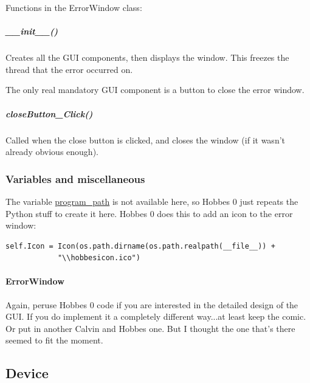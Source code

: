 \documentclass[12pt,letterpaper]{article}
\begin{document}
Functions in the ErrorWindow class:

\setcounter{subparagraph}{-1}



%
%
\subparagraph{\_\_init\_\_()}
\label{4.2.1.0.0}

Creates all the GUI components, then displays the window. This freezes the thread that the error occurred on.

The only real mandatory GUI component is a button to close the error window.



%
%
\subparagraph{closeButton\_Click()}
\label{4.2.1.0.1}

Called when the close button is clicked, and closes the window (if it wasn't already obvious enough).



%
%
\subsubsection{Variables and miscellaneous}
\label{4.2.2}

The variable \hyperref[4.1.2.1]{program\_path} is not available here, so Hobbes 0 just repeats the Python stuff to create it here. Hobbes 0 does this to add an icon to the error window:

\selectfont

\begin{lstlisting}
self.Icon = Icon(os.path.dirname(os.path.realpath(__file__)) +
            "\\hobbesicon.ico")
\end{lstlisting}

\selectfont

\setcounter{paragraph}{-1}



%
%
\paragraph{ErrorWindow}
\label{4.2.2.0}

Again, peruse Hobbes 0 code if you are interested in the detailed design of the GUI. If you do implement it a completely different way...at least keep the comic. Or put in another Calvin and Hobbes one. But I thought the one that's there seemed to fit the moment.



%
%
\subsection{Device}
\label{4.3}
\end{document}
